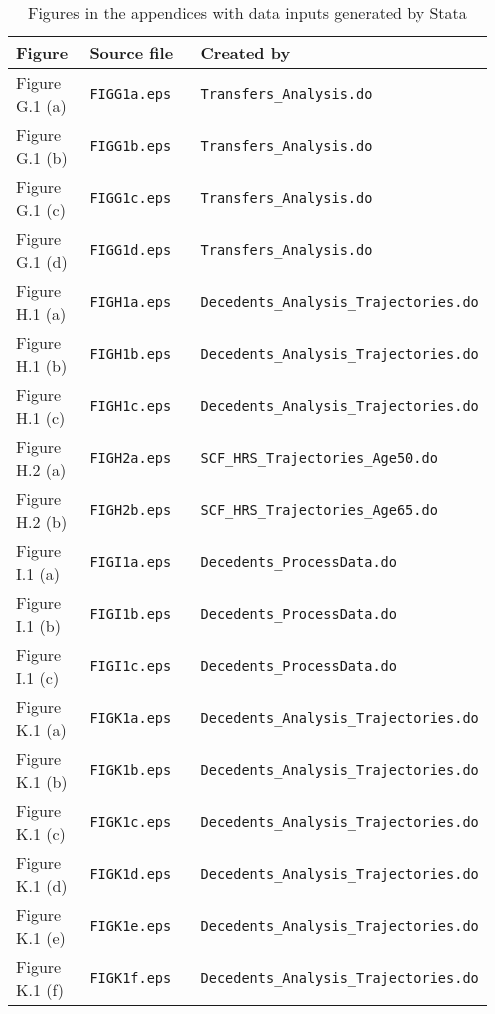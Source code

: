 \documentclass[a4,12p]{article}
\begin{document}
\begin{landscape}
\begin{table}[ht]
\caption{Figures in the appendices with data inputs generated by Stata \label{Tab:AppendixFigures}}
\begin{tabular}{p{0.20\linewidth} p{0.35\linewidth} p{0.40\linewidth}}
\toprule
Figure & Source file & Created by \\
\midrule
Figure G.1 (a) & {\tt FIGG1a.eps} & {\tt Transfers\_Analysis.do} \\
Figure G.1 (b) & {\tt FIGG1b.eps} & {\tt Transfers\_Analysis.do} \\
Figure G.1 (c) & {\tt FIGG1c.eps} & {\tt Transfers\_Analysis.do} \\
Figure G.1 (d) & {\tt FIGG1d.eps} & {\tt Transfers\_Analysis.do} \\
\midrule
Figure H.1 (a) & {\tt FIGH1a.eps} & {\tt Decedents\_Analysis\_Trajectories.do} \\
Figure H.1 (b) & {\tt FIGH1b.eps} & {\tt Decedents\_Analysis\_Trajectories.do} \\
Figure H.1 (c) & {\tt FIGH1c.eps} & {\tt Decedents\_Analysis\_Trajectories.do} \\
\midrule
Figure H.2 (a) & {\tt FIGH2a.eps} & {\tt SCF\_HRS\_Trajectories\_Age50.do} \\
Figure H.2 (b) & {\tt FIGH2b.eps} & {\tt SCF\_HRS\_Trajectories\_Age65.do} \\
\midrule
Figure I.1 (a) & {\tt FIGI1a.eps} & {\tt Decedents\_ProcessData.do} \\
Figure I.1 (b) & {\tt FIGI1b.eps} & {\tt Decedents\_ProcessData.do} \\
Figure I.1 (c) & {\tt FIGI1c.eps} & {\tt Decedents\_ProcessData.do} \\
\midrule
Figure K.1 (a) & {\tt FIGK1a.eps} & {\tt Decedents\_Analysis\_Trajectories.do} \\
Figure K.1 (b) & {\tt FIGK1b.eps} & {\tt Decedents\_Analysis\_Trajectories.do} \\
Figure K.1 (c) & {\tt FIGK1c.eps} & {\tt Decedents\_Analysis\_Trajectories.do} \\
Figure K.1 (d) & {\tt FIGK1d.eps} & {\tt Decedents\_Analysis\_Trajectories.do} \\
Figure K.1 (e) & {\tt FIGK1e.eps} & {\tt Decedents\_Analysis\_Trajectories.do} \\
Figure K.1 (f) & {\tt FIGK1f.eps} & {\tt Decedents\_Analysis\_Trajectories.do} \\
\bottomrule
\end{tabular}
\end{table}
\end{landscape}
\end{document}
